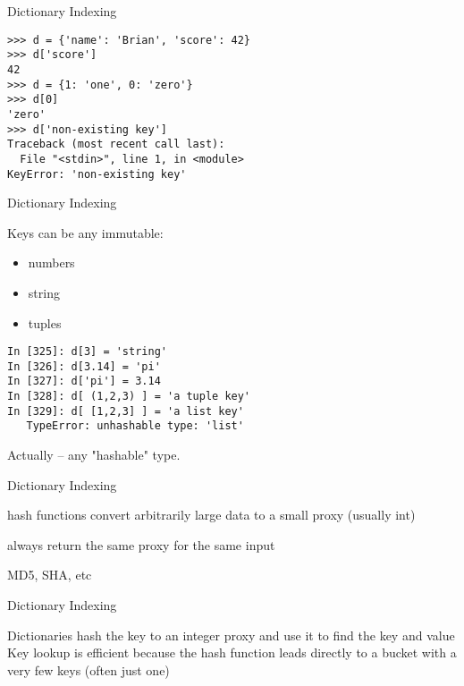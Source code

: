 \documentclass{beamer}
\begin{document}
\begin{frame}[fragile]{Dictionary Indexing}

\begin{verbatim}
>>> d = {'name': 'Brian', 'score': 42}
>>> d['score']
42
>>> d = {1: 'one', 0: 'zero'}
>>> d[0]
'zero'
>>> d['non-existing key']
Traceback (most recent call last):
  File "<stdin>", line 1, in <module>
KeyError: 'non-existing key'
\end{verbatim}

\end{frame} 

\begin{frame}[fragile]{Dictionary Indexing}

{\Large Keys can be any immutable:}
\begin{itemize}
  \item numbers
  \item string
  \item tuples
\end{itemize}

\begin{verbatim}
In [325]: d[3] = 'string'
In [326]: d[3.14] = 'pi'
In [327]: d['pi'] = 3.14
In [328]: d[ (1,2,3) ] = 'a tuple key'
In [329]: d[ [1,2,3] ] = 'a list key'
   TypeError: unhashable type: 'list'
\end{verbatim}

\vfill
Actually -- any "hashable" type.
\end{frame} 

\begin{frame}[fragile]{Dictionary Indexing}

\vfill
{\Large hash functions convert arbitrarily large data to a small proxy (usually int)

\vfill
always return the same proxy for the same input

\vfill
MD5, SHA, etc
\vfill
}
\end{frame} 

\begin{frame}[fragile]{Dictionary Indexing}

\vfill
{\Large
Dictionaries hash the key to an integer proxy and use it to find the key and value
}
\vfill
{\Large
Key lookup is efficient because the hash function leads directly to a bucket with a very few keys (often just one)
}
\vfill
\end{frame} 
\end{document}
